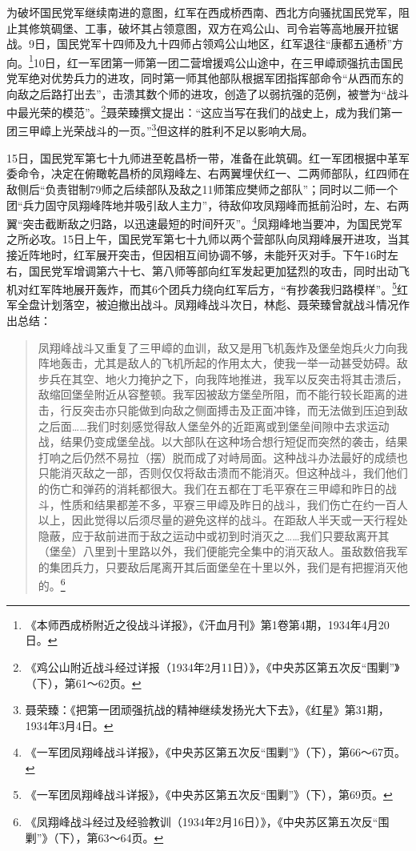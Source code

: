 为破坏国民党军继续南进的意图，红军在西成桥西南、西北方向骚扰国民党军，阻止其修筑碉堡、工事，破坏其占领意图，双方在鸡公山、司令岩等高地展开拉锯战。9日，国民党军十四师及九十四师占领鸡公山地区，红军退往“康都五通桥”方向。\footnote{《本师西成桥附近之役战斗详报》，《汗血月刊》第1卷第4期，1934年4月20日。}10日，红一军团第一师第一团二营增援鸡公山途中，在三甲嶂顽强抗击国民党军绝对优势兵力的进攻，同时第一师其他部队根据军团指挥部命令“从西而东的向敌之后路打出去”，击溃其数个师的进攻，创造了以弱抗强的范例，被誉为“战斗中最光荣的模范”。\footnote{《鸡公山附近战斗经过详报（1934年2月11日）》，《中央苏区第五次反“围剿”》（下），第61～62页。}聂荣臻撰文提出：“这应当写在我们的战史上，成为我们第一团三甲嶂上光荣战斗的一页。”\footnote{聂荣臻：《把第一团顽强抗战的精神继续发扬光大下去》，《红星》第31期，1934年3月4日。}但这样的胜利不足以影响大局。


15日，国民党军第七十九师进至乾昌桥一带，准备在此筑碉。红一军团根据中革军委命令，决定在俯瞰乾昌桥的凤翔峰左、右两翼埋伏红一、二两师部队，红四师在敌侧后“负责钳制79师之后续部队及敌之11师策应樊师之部队”；同时以二师一个团“兵力固守凤翔峰阵地并吸引敌人主力”，待敌仰攻凤翔峰而抵前沿时，左、右两翼“突击截断敌之归路，以迅速最短的时间歼灭”。\footnote{《一军团凤翔峰战斗详报》，《中央苏区第五次反“围剿”》（下），第66～67页。}凤翔峰地当要冲，为国民党军之所必攻。15日上午，国民党军第七十九师以两个营部队向凤翔峰展开进攻，当其接近阵地时，红军展开突击，但因相互间协调不够，未能歼灭对手。下午16时左右，国民党军增调第六十七、第八师等部向红军发起更加猛烈的攻击，同时出动飞机对红军阵地展开轰炸，而其6个团兵力绕向红军后方，“有抄袭我归路模样”。\footnote{《一军团凤翔峰战斗详报》，《中央苏区第五次反“围剿”》（下），第69页。}红军全盘计划落空，被迫撤出战斗。凤翔峰战斗次日，林彪、聂荣臻曾就战斗情况作出总结：

\begin{quote}

凤翔峰战斗又重复了三甲嶂的血训，敌又是用飞机轰炸及堡垒炮兵火力向我阵地轰击，尤其是敌人的飞机所起的作用太大，使我一举一动甚受妨碍。敌步兵在其空、地火力掩护之下，向我阵地推进，我军以反突击将其击溃后，敌缩回堡垒附近从容整顿。我军因被敌方堡垒所阻，而不能行较长距离的进击，行反突击亦只能做到向敌之侧面搏击及正面冲锋，而无法做到压迫到敌之后面……我们时刻感觉得敌人堡垒外的近距离或到堡垒间隙中去求运动战，结果仍变成堡垒战。以大部队在这种场合想行短促而突然的袭击，结果打响之后仍然不易拉（摆）脱而成了对峙局面。这种战斗办法最好的成绩也只能消灭敌之一部，否则仅仅将敌击溃而不能消灭。但这种战斗，我们他们的伤亡和弹药的消耗都很大。我们在五都在丁毛平寮在三甲嶂和昨日的战斗，性质和结果都差不多，平寮三甲嶂及昨日的战斗，我们伤亡在约一百人以上，因此觉得以后须尽量的避免这样的战斗。在距敌人半天或一天行程处隐蔽，应于敌前进而于敌之运动中或初到时消灭之……我们只要敌离开其（堡垒）八里到十里路以外，我们便能完全集中的消灭敌人。虽敌数倍我军的集团兵力，只要敌后尾离开其后面堡垒在十里以外，我们是有把握消灭他的。\footnote{《凤翔峰战斗经过及经验教训（1934年2月16日）》，《中央苏区第五次反“围剿”》（下），第63～64页。}
\end{quote}


